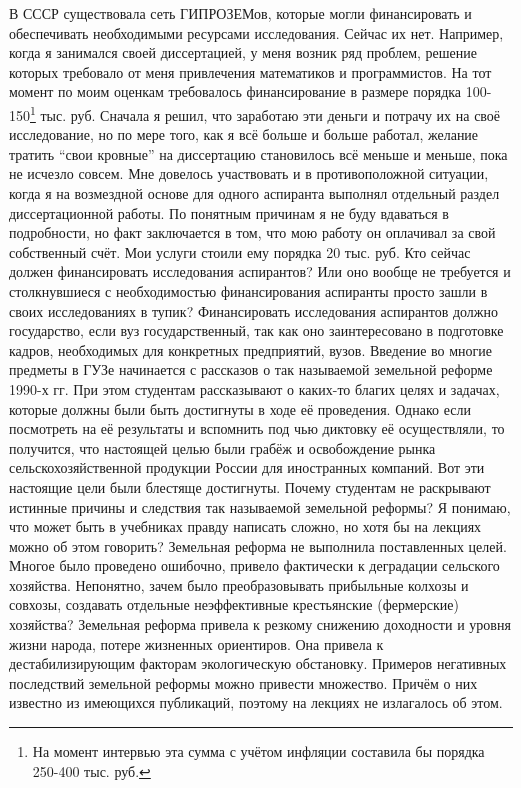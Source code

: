 \begin{drama}
	В СССР существовала сеть ГИПРОЗЕМов, которые могли финансировать и обеспечивать необходимыми ресурсами исследования. Сейчас их нет. Например, когда я занимался своей диссертацией, у меня возник ряд проблем, решение которых требовало от меня привлечения математиков и программистов. На тот момент по моим оценкам требовалось финансирование в размере порядка 100-150\footnote{На момент интервью эта сумма с учётом инфляции составила бы порядка 250-400 тыс. руб.} тыс. руб. Сначала я решил, что заработаю эти деньги и потрачу их на своё исследование, но по мере того, как я всё больше и больше работал, желание тратить “свои кровные” на диссертацию становилось всё меньше и меньше, пока не исчезло совсем. Мне довелось участвовать и в противоположной ситуации, когда я на возмездной основе для одного аспиранта выполнял отдельный раздел диссертационной работы. По понятным причинам я не буду вдаваться в подробности, но факт заключается в том, что мою работу он оплачивал за свой собственный счёт. Мои услуги стоили ему порядка 20 тыс. руб. 
	Кто сейчас должен финансировать исследования аспирантов? Или оно вообще не требуется и столкнувшиеся с необходимостью финансирования аспиранты просто зашли в своих исследованиях в тупик?
	\michaelspeaks Финансировать исследования аспирантов должно государство, если вуз государственный, так как оно заинтересовано в подготовке кадров, необходимых для конкретных предприятий, вузов.
	\maxspeaks Введение во многие предметы в ГУЗе начинается с рассказов о так называемой земельной реформе 1990-х гг. При этом студентам рассказывают о каких-то благих целях и задачах, которые должны были быть достигнуты в ходе её проведения. Однако если посмотреть на её результаты и вспомнить под чью диктовку её осуществляли, то получится, что настоящей целью были грабёж и освобождение рынка сельскохозяйственной продукции России для иностранных компаний. Вот эти настоящие цели были блестяще достигнуты. 
Почему студентам не раскрывают истинные причины и следствия так называемой земельной реформы? Я понимаю, что может быть в учебниках правду написать сложно, но хотя бы на лекциях можно об этом говорить?
	\michaelspeaks Земельная реформа не выполнила поставленных целей. Многое было проведено ошибочно, привело фактически к деградации сельского хозяйства. Непонятно, зачем было преобразовывать прибыльные колхозы и совхозы, создавать отдельные неэффективные крестьянские (фермерские) хозяйства?
	Земельная реформа привела к резкому снижению доходности и уровня жизни народа, потере жизненных ориентиров. Она привела к дестабилизирующим факторам экологическую обстановку. Примеров негативных последствий земельной реформы можно привести множество. Причём о них известно из имеющихся публикаций, поэтому на лекциях не излагалось об этом.

\end{drama}
